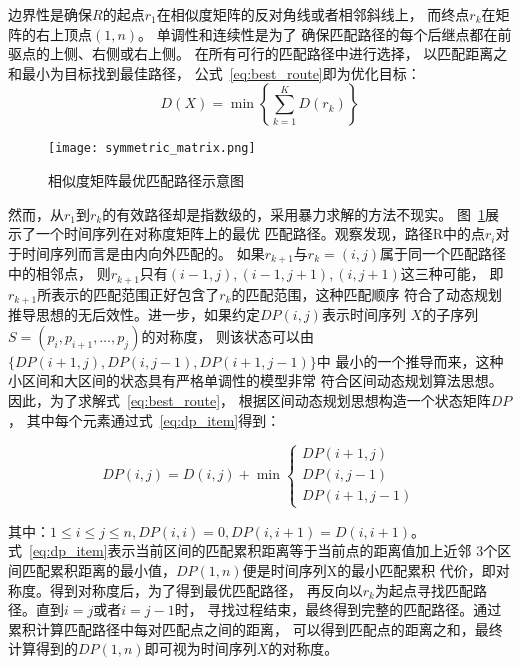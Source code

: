 边界性是确保$R$的起点$r_1$在相似度矩阵的反对角线或者相邻斜线上，
而终点$r_k$在矩阵的右上顶点$\left(1,n\right)$。
单调性和连续性是为了
确保匹配路径的每个后继点都在前驱点的上侧、右侧或右上侧。
在所有可行的匹配路径中进行选择，
以匹配距离之和最小为目标找到最佳路径，
公式~\ref{eq:best_route}即为优化目标：
\begin{equation}
  D(X)=\min \left\{\sum_{k=1}^{K} D\left(r_{k}\right)\right\}
  \label{eq:best_route}
\end{equation}

\begin{figure}
  \centering
  \texttt{[image: symmetric\_matrix.png]}
  \caption{相似度矩阵最优匹配路径示意图}
  \label{fig:symmetric_matrix}
\end{figure}

然而，从$r_1$到$r_k$的有效路径却是指数级的，采用暴力求解的方法不现实。
图~\ref{fig:symmetric_matrix}展示了一个时间序列在对称度矩阵上的最优
匹配路径。观察发现，路径R中的点$r_i$对于时间序列而言是由内向外匹配的。
如果$r_{k+1}$与$r_k=\left(i,j\right)$属于同一个匹配路径中的相邻点，
则$r_{k+1}$只有$(i-1, j),(i-1, j+1),(i, j+1)$这三种可能，
即$r_{k+1}$所表示的匹配范围正好包含了$r_k$的匹配范围，这种匹配顺序
符合了动态规划推导思想的无后效性。进一步，如果约定$D P(i, j)$表示时间序列
$X$的子序列$S=\left(p_{i}, p_{i+1}, \dots, p_{j}\right)$的对称度，
则该状态可以由$\{D P(i+1, j), D P(i, j-1), D P(i+1, j-1)\}$中
最小的一个推导而来，这种小区间和大区间的状态具有严格单调性的模型非常
符合区间动态规划算法思想。因此，为了求解式~\ref{eq:best_route}，
根据区间动态规划思想构造一个状态矩阵$DP$， 
其中每个元素通过式~\ref{eq:dp_item}得到：

\begin{equation}
  D P(i, j)=D(i, j)+\min \left\{\begin{array}{c}
    D P(i+1, j) \\
    D P(i, j-1) \\
    D P(i+1, j-1)
  \end{array}\right.
  \label{eq:dp_item}
\end{equation}

其中：$1 \leq i \leq j \leq n, D P(i, i)=0, D P(i, i+1)=D(i, i+1)$。
式~\ref{eq:dp_item}表示当前区间的匹配累积距离等于当前点的距离值加上近邻
3个区间匹配累积距离的最小值，$D P(1, n)$便是时间序列X的最小匹配累积
代价，即对称度。得到对称度后，为了得到最优匹配路径，
再反向以$r_k$为起点寻找匹配路径。直到$i=j$或者$i=j-1$时，
寻找过程结束，最终得到完整的匹配路径。通过累积计算匹配路径中每对匹配点之间的距离，
可以得到匹配点的距离之和，最终计算得到的$DP(1,n)$即可视为时间序列$X$的对称度。

